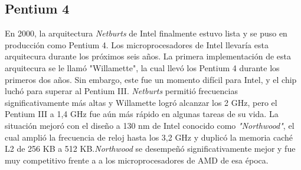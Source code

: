 \subsection{Pentium 4}
En 2000, la arquitectura \emph{Netburts} de Intel finalmente estuvo lista y se puso en producción como Pentium 4. Los microprocesadores de Intel llevaría esta 
arquitecura durante los próximos seis años. La primera implementación de esta arquitecura se le llamó "Willamette", la cual llevó los Pentium 4 
durante los primeros dos años. Sin embargo, este fue un momento difícil para Intel, y el chip luchó para superar al Pentium III. \emph{Netburts} permitió 
frecuencias significativamente más altas y Willamette logró alcanzar los 2 GHz, pero el Pentium III a 1,4 GHz fue aún más rápido en algunas tareas
de su vida. La situación mejoró con el diseño a 130 nm de Intel conocido como \emph{"Northwood"}, el cual  amplió la frecuencia de reloj hasta los 3,2 GHz y 
duplicó la memoria caché L2 de 256 KB a 512 KB.\emph{Northwood} se desempeñó significativamente mejor y fue muy competitivo frente a a los microprocesadores 
de AMD de esa época.

